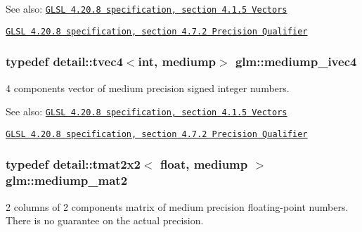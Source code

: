 \begin{Desc}
\item[See also:]\href{http://www.opengl.org/registry/doc/GLSLangSpec.4.20.8.pdf}{\tt GLSL 4.20.8 specification, section 4.1.5 Vectors} 

\href{http://www.opengl.org/registry/doc/GLSLangSpec.4.20.8.pdf}{\tt GLSL 4.20.8 specification, section 4.7.2 Precision Qualifier} \end{Desc}
\hypertarget{group__core__precision_ga4c23a132d76436e041747b0c03265ad}{
\subsubsection[mediump\_\-ivec4]{\setlength{\rightskip}{0pt plus 5cm}typedef detail::tvec4$<$int, mediump$>$ {\bf glm::mediump\_\-ivec4}}}
\label{group__core__precision_ga4c23a132d76436e041747b0c03265ad}


4 components vector of medium precision signed integer numbers.

\begin{Desc}
\item[See also:]\href{http://www.opengl.org/registry/doc/GLSLangSpec.4.20.8.pdf}{\tt GLSL 4.20.8 specification, section 4.1.5 Vectors} 

\href{http://www.opengl.org/registry/doc/GLSLangSpec.4.20.8.pdf}{\tt GLSL 4.20.8 specification, section 4.7.2 Precision Qualifier} \end{Desc}
\hypertarget{group__core__precision_g6ed8bfa67b72cea216cb558411f95f86}{
\subsubsection[mediump\_\-mat2]{\setlength{\rightskip}{0pt plus 5cm}typedef detail::tmat2x2$<$ float, mediump $>$ {\bf glm::mediump\_\-mat2}}}
\label{group__core__precision_g6ed8bfa67b72cea216cb558411f95f86}


2 columns of 2 components matrix of medium precision floating-point numbers. There is no guarantee on the actual precision.

